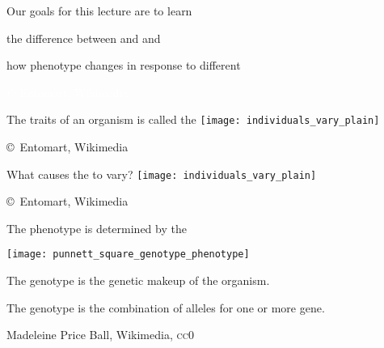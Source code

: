 \documentclass[t]{beamer}
\begin{document}
\begin{frame}[t]{Our goals for this lecture are to learn}

	
	\hangpara	the difference between  and  and

	\hangpara how phenotype changes in response to different 
	
\end{frame}

%
{
\begin{frame}[b]
\hfill\textcolor{white}{\tiny \copyright\, Entomart, Wikimedia}
\end{frame}
}
\begin{frame}[t]{The traits of an organism is called the }
	\centering
	\texttt{[image: individuals\_vary\_plain]}\par
	
	\vfilll
	
	\hfill\tiny \copyright\, Entomart, Wikimedia

\end{frame}
%
\begin{frame}[t]{What causes the  to vary?}
	\centering
	\texttt{[image: individuals\_vary\_plain]}
	
		\vfilll
	
	\hfill\tiny \copyright\, Entomart, Wikimedia

\end{frame}
%
\begin{frame}[t]{The phenotype is determined by the }

	\begin{multicols}{2}
	
		\texttt{[image: punnett\_square\_genotype\_phenotype]}
	
	\columnbreak

	The genotype is the genetic makeup of the organism.\vspace*{2\baselineskip}
	
	The genotype is the combination of alleles for one or more gene.
	
	\end{multicols}
	
	\vfilll
	
	\tiny Madeleine Price Ball, Wikimedia, \textsc{cc0}

\end{frame}
\end{document}
